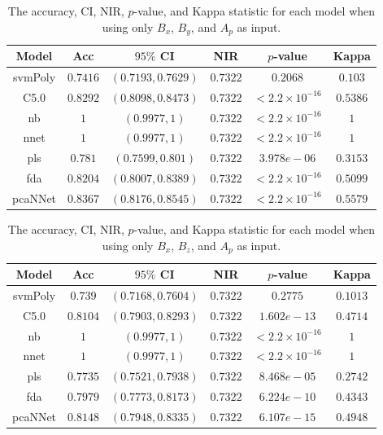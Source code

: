 \documentclass[sn-mathphys-num]{sn-jnl}%
\begin{document}
\begin{table}[!ht]
    \centering
    \caption{The accuracy, CI, NIR, $p$-value, and Kappa statistic for each model when using only $B_{x}$, $B_{y}$, and $A_{p}$ as input.}
	\label{tab:stats:reverse:xyap}
	\begin{tabular}{|c|c|c|c|c|c|}
		\hline
		Model & Acc & $95\%$ CI & NIR & $p$-value & Kappa \\ \hline
		svmPoly & $0.7416$ & $(0.7193, 0.7629)$ & $0.7322$ & $0.2068$ & $0.103$ \\ \hline
		C5.0 & $0.8292$ & $(0.8098, 0.8473)$ & $0.7322$ & $< 2.2 \times {10}^{-16}$ & $0.5386$ \\ \hline
		nb & $1$ & $(0.9977, 1)$ & $0.7322$ & $< 2.2 \times {10}^{-16}$ & $1$ \\ \hline
		nnet & $1$ & $(0.9977, 1)$ & $0.7322$ & $< 2.2 \times {10}^{-16}$ & $1$ \\ \hline
		pls & $0.781$ & $(0.7599, 0.801)$ & $0.7322$ & $3.978e-06$ & $0.3153$ \\ \hline
		fda & $0.8204$ & $(0.8007, 0.8389)$ & $0.7322$ & $< 2.2 \times {10}^{-16}$ & $0.5099$ \\ \hline
		pcaNNet & $0.8367$ & $(0.8176, 0.8545)$ & $0.7322$ & $< 2.2 \times {10}^{-16}$ & $0.5579$ \\ \hline
	\end{tabular}
\end{table}

\begin{table}[!ht]
    \centering
    \caption{The accuracy, CI, NIR, $p$-value, and Kappa statistic for each model when using only $B_{x}$, $B_{z}$, and $A_{p}$ as input.}
	\label{tab:stats:reverse:xzap}
	\begin{tabular}{|c|c|c|c|c|c|}
		\hline
		Model & Acc & $95\%$ CI & NIR & $p$-value & Kappa \\ \hline
		svmPoly & $0.739$ & $(0.7168, 0.7604)$ & $0.7322$ & $0.2775$ & $0.1013$ \\ \hline
		C5.0 & $0.8104$ & $(0.7903, 0.8293)$ & $0.7322$ & $1.602e-13$ & $0.4714$ \\ \hline
		nb & $1$ & $(0.9977, 1)$ & $0.7322$ & $< 2.2 \times {10}^{-16}$ & $1$ \\ \hline
		nnet & $1$ & $(0.9977, 1)$ & $0.7322$ & $< 2.2 \times {10}^{-16}$ & $1$ \\ \hline
		pls & $0.7735$ & $(0.7521, 0.7938)$ & $0.7322$ & $8.468e-05$ & $0.2742$ \\ \hline
		fda & $0.7979$ & $(0.7773, 0.8173)$ & $0.7322$ & $6.224e-10$ & $0.4343$ \\ \hline
		pcaNNet & $0.8148$ & $(0.7948, 0.8335)$ & $0.7322$ & $6.107e-15$ & $0.4948$ \\ \hline
	\end{tabular}
\end{table}
\end{document}
